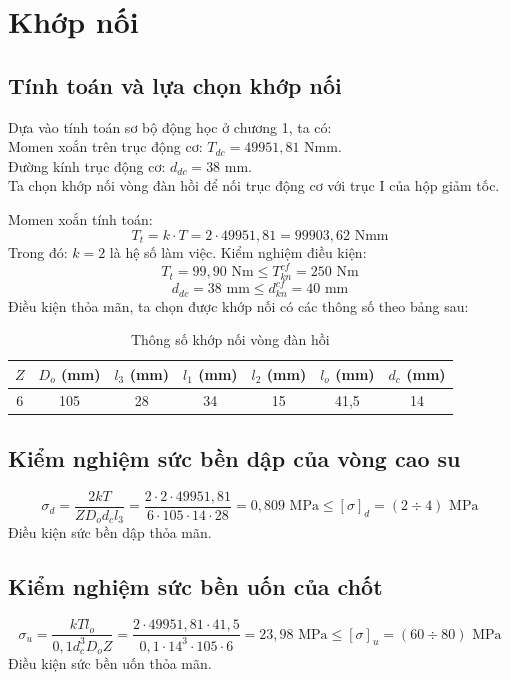 \documentclass[12pt,a4paper]{report}
\begin{document}
\section{Khớp nối}

\subsection{Tính toán và lựa chọn khớp nối}
Dựa vào tính toán sơ bộ động học ở chương 1, ta có:\\
Momen xoắn trên trục động cơ: $T_{dc} = 49951{,}81$ Nmm.\\
Đường kính trục động cơ: $d_{dc} = 38$ mm.\\
Ta chọn khớp nối vòng đàn hồi để nối trục động cơ với trục I của hộp giảm tốc.

Momen xoắn tính toán:
$$T_t = k \cdot T = 2 \cdot 49951{,}81 = 99903{,}62 \text{ Nmm}$$
Trong đó: $k = 2$ là hệ số làm việc.
Kiểm nghiệm điều kiện:
$$T_t = 99{,}90 \text{ Nm} \leq T_{kn}^{cf} = 250 \text{ Nm}$$
$$d_{dc} = 38 \text{ mm} \leq d_{kn}^{cf} = 40 \text{ mm}$$
Điều kiện thỏa mãn, ta chọn được khớp nối có các thông số theo bảng sau:

\begin{table}[H]
    \centering
    \caption{Thông số khớp nối vòng đàn hồi}
    \label{tab:4.1}
    \begin{tabular}{|c|c|c|c|c|c|c|}
        \hline
        $Z$ & $D_o$ (mm) & $l_3$ (mm) & $l_1$ (mm) & $l_2$ (mm) & $l_o$ (mm) & $d_c$ (mm) \\
        \hline
        6 & 105 & 28 & 34 & 15 & 41,5 & 14 \\
        \hline
    \end{tabular}
\end{table}

\subsection{Kiểm nghiệm sức bền dập của vòng cao su}
$$\sigma_d = \frac{2kT}{Z D_o d_c l_3} = \frac{2 \cdot 2 \cdot 49951{,}81}{6 \cdot 105 \cdot 14 \cdot 28} = 0{,}809 \text{ MPa} \leq [\sigma]_d = (2 \div 4) \text{ MPa}$$
Điều kiện sức bền dập thỏa mãn.

\subsection{Kiểm nghiệm sức bền uốn của chốt}
$$\sigma_u = \frac{kT l_o}{0{,}1 d_c^3 D_o Z} = \frac{2 \cdot 49951{,}81 \cdot 41{,}5}{0{,}1 \cdot 14^3 \cdot 105 \cdot 6} = 23{,}98 \text{ MPa} \leq [\sigma]_u = (60 \div 80) \text{ MPa}$$
Điều kiện sức bền uốn thỏa mãn.
\end{document}
